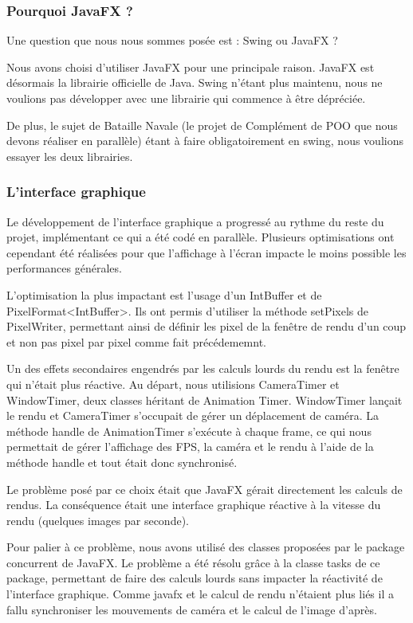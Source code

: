 \subsubsection{Pourquoi JavaFX ?}

Une question que nous nous sommes posée est : Swing ou JavaFX ?

Nous avons choisi d'utiliser JavaFX pour une principale raison. JavaFX est désormais la librairie officielle de Java. Swing n'étant plus maintenu, nous ne voulions pas développer avec une librairie qui commence à être dépréciée.

De plus, le sujet de Bataille Navale (le projet de Complément de POO que nous devons réaliser en parallèle) étant à faire obligatoirement en swing, nous voulions essayer les deux librairies.


\subsubsection{L'interface graphique}

Le développement de l'interface graphique a progressé au rythme du reste du projet, implémentant ce qui a été codé en parallèle. Plusieurs optimisations ont cependant été réalisées pour que l'affichage à l'écran impacte le moins possible les performances générales.

L'optimisation la plus impactant est l'usage d'un IntBuffer et de PixelFormat<IntBuffer>. Ils ont permis d'utiliser la méthode setPixels de PixelWriter, permettant ainsi de définir les pixel de la fenêtre de rendu d'un coup et non pas pixel par pixel comme fait précédememnt.

Un des effets secondaires engendrés par les calculs lourds du rendu est la fenêtre qui n'était plus réactive.
Au départ, nous utilisions CameraTimer et WindowTimer, deux classes héritant de Animation Timer. WindowTimer lançait le rendu et CameraTimer s'occupait de gérer un déplacement de caméra. La méthode handle de AnimationTimer s'exécute à chaque frame, ce qui nous permettait de gérer l'affichage des FPS, la caméra et le rendu à l'aide de la méthode handle et tout était donc synchronisé.

Le problème posé par ce choix était que JavaFX gérait directement les calculs de rendus. La conséquence était une interface graphique réactive à la vitesse du rendu (quelques images par seconde).

\label{UsageTask}

Pour palier à ce problème, nous avons utilisé des classes proposées par le package concurrent de JavaFX. Le problème a été résolu grâce à la classe tasks de ce package, permettant de faire des calculs lourds sans impacter la réactivité de l'interface graphique. Comme javafx et le calcul de rendu n'étaient plus liés il a fallu synchroniser les mouvements de caméra et le calcul de l'image d'après.



